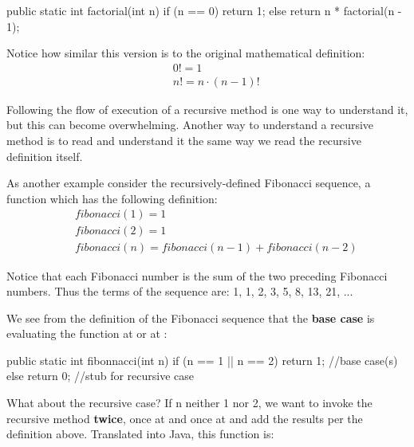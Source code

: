 \begin{code}
public static int factorial(int n) {
    if (n == 0) {
        return 1;
    } else {
       return n * factorial(n - 1);
    }
}
\end{code}

Notice how similar this version is to the original mathematical definition:
%
\begin{eqnarray*}
&&  0! = 1 \\
&&  n! = n \cdot(n-1)!
\end{eqnarray*}
%

Following the flow of execution of a recursive method is one way to understand it, but this can become overwhelming.  Another way to understand a recursive method is to read and understand it the same way we read the recursive definition itself.

\label{fibonacci}


As another example consider the recursively-defined Fibonacci sequence, a function which has the following definition:
%
\begin{eqnarray*}
&& fibonacci(1) = 1 \\
&& fibonacci(2) = 1 \\
&& fibonacci(n) = fibonacci(n-1) + fibonacci(n-2)
\end{eqnarray*}
%

Notice that each Fibonacci number is the sum of the two preceding Fibonacci numbers.  Thus the terms of the sequence are: 1, 1, 2, 3, 5, 8, 13, 21, ...

We see from the definition of the Fibonacci sequence that the \textbf{base case} is evaluating the function at  or at :

\begin{code}
public static int fibonnacci(int n) {
   if (n == 1 || n == 2) {
      return 1;  //base case(s)
   } else {
      return 0;  //stub for recursive case
   }
}
\end{code}

What about the recursive case?  If n neither 1 nor 2, we want to invoke the recursive method \textbf{twice}, once at  and once at  and add the results per the definition above.  Translated into Java, this function is:

